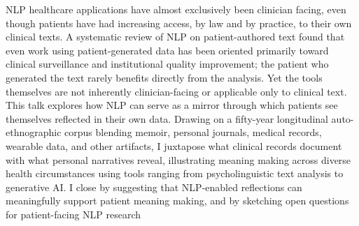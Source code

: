 NLP healthcare applications have almost exclusively been clinician facing, even though patients have had increasing access, by law and by practice, to their own clinical texts. A systematic review of NLP on patient-authored text found that even work using patient-generated data has been oriented primarily toward clinical surveillance and institutional quality improvement; the patient who generated the text rarely benefits directly from the analysis. Yet the tools themselves are not inherently clinician-facing or applicable only to clinical text. This talk explores how NLP can serve as a mirror through which patients see themselves reflected in their own data. Drawing on a fifty-year longitudinal auto-ethnographic corpus blending memoir, personal journals, medical records, wearable data, and other artifacts, I juxtapose what clinical records document with what personal narratives reveal, illustrating meaning making across diverse health circumstances using tools ranging from psycholinguistic text analysis to generative AI. I close by suggesting that NLP-enabled reflections can meaningfully support patient meaning making, and by sketching open questions for patient-facing NLP research